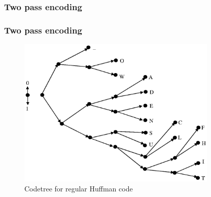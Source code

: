 \documentclass[14pt]{beamer}
\begin{document}
\begin{frame}
\frametitle{Two pass encoding}
\begin{itemize}    

    \begin{table}[htbp]
    \caption{Number of bits for regular code tree transmitting}
    \label{tab_bits_for_tree}
    \end{table}
    
\end{itemize}
\end{frame}



\begin{frame}
\frametitle{Two pass encoding}
\begin{itemize}    
    \begin{figure}[ht]
    \begin{minipage}{1.0\linewidth}
    \includegraphics[width=0.85\textwidth]{fig3_2.eps}
    \caption{Codetree for regular Huffman code}
    \label{HUF_tree_reg}
    \end{minipage}
    \end{figure}
    
\end{itemize}
\end{frame}
\end{document}
